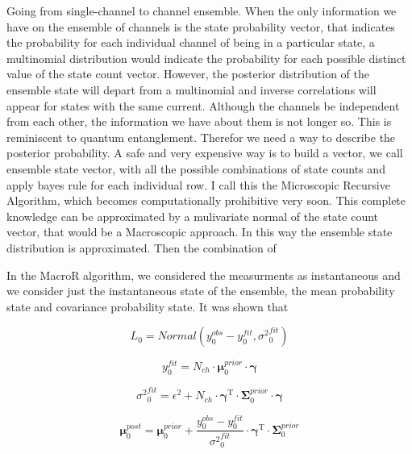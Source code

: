 \documentclass[pdflatex,sn-mathphys-num]{sn-jnl}%
\theoremstyle{thmstyleone}%
\theoremstyle{thmstyletwo}%
\theoremstyle{thmstylethree}%
\begin{document}
Going from single-channel to channel ensemble. 
When the only information we have on the ensemble of channels is the state probability vector, that indicates the probability for each individual channel of being in a particular state, a multinomial distribution would indicate the probability for each  possible distinct value of the state count vector. 
However, the posterior distribution of the ensemble state will depart from a multinomial and inverse correlations will appear for states with the same current. Although the channels be independent from each other, the information we have about them is not longer so. This is reminiscent to quantum entanglement. Therefor we need a way to describe the posterior probability. 
A safe and very expensive way is to build a vector, we call ensemble state vector, with all the possible combinations of state counts and apply bayes rule for each individual row. I call this the Microscopic Recursive Algorithm, which becomes computationally prohibitive very soon. 
This complete knowledge can be approximated by a mulivariate normal of the state count vector, that would be a Macroscopic approach. In this way the ensemble state distribution is approximated. Then the combination of 

In the MacroR algorithm, we considered the measurments as instantaneous and we consider just the instantaneous state of the ensemble, the mean probability state and  covariance probability state. It was shown that 

\begin{equation}
L_0= Normal \left (y^{obs}_0-y^{fit}_0, {\sigma^2}^{fit}_{0} \right)
\end{equation}


\begin{equation}
y^{fit}_0 = N_{ch} \cdot \mathbf \mu^{prior}_0 \cdot \mathbf \gamma
\end{equation}



\begin{equation}
{\sigma^2}^{fit}_{0}
= \epsilon^2 +N_{ch} \cdot {\mathbf \gamma}^{\mathrm{T}} \cdot \mathbf \Sigma^{prior}_0 \cdot \mathbf \gamma
\end{equation}

\begin{equation}
\mathbf \mu^{post}_0= \mathbf \mu^{prior}_0 + {\frac {y^{obs}_0 - y^{fit}_0}{{\sigma^2}^{fit}_0} }\cdot {\mathbf \gamma}^\mathrm{T} \cdot \mathbf \Sigma^{prior}_0 
\end{equation}
\end{document}
